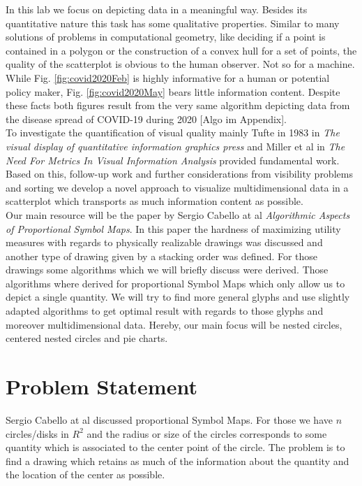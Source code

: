 \documentclass[a4paper,11pt]{article}
\begin{document}
%
In this lab we focus on depicting data in a meaningful way. Besides its quantitative nature this task has some qualitative properties. Similar to many solutions of problems in computational geometry, like deciding if a point is contained in a polygon or the construction of a convex hull for a set of points, the quality of the scatterplot is obvious to the human observer. Not so for a machine. While Fig. \ref{fig:covid2020Feb} is highly informative for a human or potential policy maker, Fig. \ref{fig:covid2020May} bears little information content. Despite these facts both figures result from the very same algorithm depicting data from the disease spread of COVID-19 during 2020 [Algo im Appendix].\\

To investigate the quantification of visual quality mainly Tufte in 1983 in \textit{The visual display of quantitative information graphics press} and Miller et al in \textit{The Need For Metrics In Visual Information Analysis} provided fundamental work. Based on this, follow-up work and further considerations from visibility problems and sorting we develop a novel approach to visualize multidimensional data in a scatterplot which transports as much information content as possible.\\

Our main resource will be the paper by Sergio Cabello at al \textit{Algorithmic Aspects of Proportional Symbol Maps}. In this paper the hardness of maximizing utility measures with regards to physically realizable drawings was discussed and another type of drawing given by a stacking order was defined. For those drawings some algorithms which we will briefly discuss were derived. Those algorithms where derived for proportional Symbol Maps which only allow us to depict a single quantity. We will try to find more general glyphs and use slightly adapted algorithms to get optimal result with regards to those glyphs and moreover multidimensional data. Hereby, our main focus will be nested circles, centered nested circles and pie charts.

\newpage

\section{Problem Statement}
Sergio Cabello at al discussed proportional Symbol Maps. For those we have $n$ circles/disks in $R^2$ and the radius or size of the circles corresponds to some quantity which is associated to the center point of the circle. The problem is to find a drawing which retains as much of the information about the quantity and the location of the center as possible. \\
\end{document}
